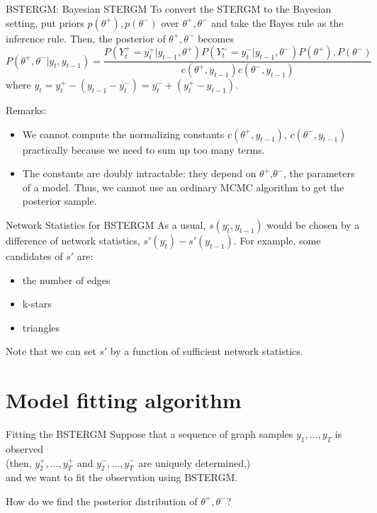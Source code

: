 \documentclass[aspectratio=169,ignorenonframetext,9pt]{beamer}
\theoremstyle{plain}
\theoremstyle{definition}
\begin{document}
\begin{frame}{BSTERGM: Bayesian STERGM}
    To convert the STERGM to the Bayesian setting, put priors $p(\theta^+),p(\theta^-)$ over $\theta^+,\theta^-$ and take the Bayes rule as the inference rule.
    Then, the posterior of $\theta^+,\theta^-$ becomes
    \[P(\theta^+,\theta^-|y_t, y_{t-1}) = \frac{P(Y_t^+=y_t^+|y_{t-1},\theta^+) P(Y_t^-=y_t^-|y_{t-1},\theta^-)P(\theta^+),P(\theta^-)}{c(\theta^+,y_{t-1})c(\theta^-,y_{t-1})} \]
    where $y_t=y_t^+ - (y_{t-1} - y_t^-) = y_t^- + (y_t^+ - y_{t-1})$.

    Remarks:
    \begin{itemize}
        \item We cannot compute the normalizing constants $c(\theta^+,y_{t-1})$, $c(\theta^-,y_{t-1})$ practically because we need to sum up too many terms.
        \item The constants are doubly intractable: they depend on $\theta^+$,$\theta^-$, the parameters of a model.
            Thus, we cannot use an ordinary MCMC algorithm to get the posterior sample.
    \end{itemize}
\end{frame}

\begin{frame}{Network Statistics for BSTERGM}
    As a usual, $s(y_{t}^.,y_{t-1})$ would be chosen by a difference of network statistics, $s'(y_t^.)-s'(y_{t-1})$.
    For example, some candidates of $s'$ are:
    \begin{itemize}
        \item the number of edges
        \item k-stars
        \item triangles
    \end{itemize}
    Note that we can set $s'$ by a function of sufficient network statistics.
\end{frame}

\section{Model fitting algorithm}
\begin{frame}{Fitting the BSTERGM}
    Suppose that a sequence of graph samples $y_1,...,y_T$ is observed
    \\ (then, $y_2^+,...,y_T^+$ and $y_2^-,...,y_T^-$ are uniquely determined,) 
    \\ and we want to fit the observation using BSTERGM.
    
    How do we find the posterior distribution of $\theta^+,\theta^-$?
\end{frame}
\end{document}
